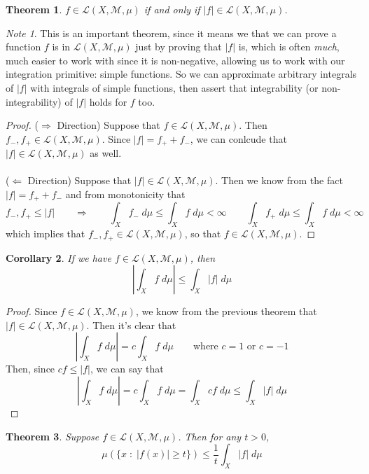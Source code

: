 \documentclass[12pt]{article}
\theoremstyle{plain}
\newtheorem{thm}{Theorem}[subsection]
\newtheorem{cor}[thm]{Corollary}
\theoremstyle{definition}
\theoremstyle{remark}
\newtheorem*{note}{Note}
\begin{document}
\begin{thm}
$f\in\mathscr{L}(X,\mathscr{M},\mu)$ if and only if $|f|\in\mathscr{L}(X,\mathscr{M},\mu)$.
\end{thm}
\begin{note}
This is an important theorem, since it means we that we can prove a function $f$ is in $\mathscr{L}(X,\mathscr{M},\mu)$ just by proving that $|f|$ is, which is often \emph{much}, much easier to work with since it is non-negative, allowing us to work with our integration primitive: simple functions. So we can approximate arbitrary integrals of $|f|$ with integrals of simple functions, then assert that integrability (or non-integrability) of $|f|$ holds for $f$ too.
\end{note}
\begin{proof}
($\Rightarrow$ Direction) Suppose that $f\in\mathscr{L}(X,\mathscr{M},\mu)$. Then $f_-, f_+\in\mathscr{L}(X,\mathscr{M},\mu)$. Since $|f|=f_+ + f_-$, we can conlcude that $|f|\in\mathscr{L}(X,\mathscr{M},\mu)$ as well.
\\
\\
($\Leftarrow$ Direction) Suppose that $|f|\in\mathscr{L}(X,\mathscr{M},\mu)$. Then we know from the fact $|f|=f_+ + f_-$ and from monotonicity that
\[
    f_-, f_+ \leq |f| \qquad \Rightarrow
    \qquad 
    \int_X f_- \; d\mu \leq \int_X f \; d\mu <\infty\qquad
    \int_X f_+ \; d\mu \leq \int_X f \; d\mu <\infty
\]
which implies that $f_-, f_+\in\mathscr{L}(X,\mathscr{M},\mu)$, so that $f\in\mathscr{L}(X,\mathscr{M},\mu)$.
\end{proof}

\begin{cor} If we have $f\in\mathscr{L}(X,\mathscr{M},\mu)$, then 
\[ 
    \left\lvert \int_X f \; d\mu\right\rvert \leq
    \int_X \left\lvert f \right\rvert \; d\mu
\]
\end{cor}
\begin{proof}
Since $f\in\mathscr{L}(X,\mathscr{M},\mu)$, we know from the previous theorem that $|f|\in\mathscr{L}(X,\mathscr{M},\mu)$. Then it's clear that 
\[ 
    \left\lvert \int_X f \; d\mu\right\rvert 
    = c \int_X f \; d\mu\qquad\text{where $c=1$ or $c=-1$}
\]
Then, since $cf\leq |f|$, we can say that 
\[ 
    \left\lvert \int_X f \; d\mu\right\rvert 
    = c \int_X f \; d\mu 
    = \int_X c f \; d\mu \leq 
     \int_X |f| \; d\mu 
\]
\end{proof}

\begin{thm}
Suppose $f\in\mathscr{L}(X,\mathscr{M},\mu)$. Then for any $t>0$,
\[
    \mu\left(\{x\;:\;|f(x)|\geq t\}\right) \leq \frac{1}{t}\int_{X} |f|\; d\mu
\]

\end{thm}
\end{document}
